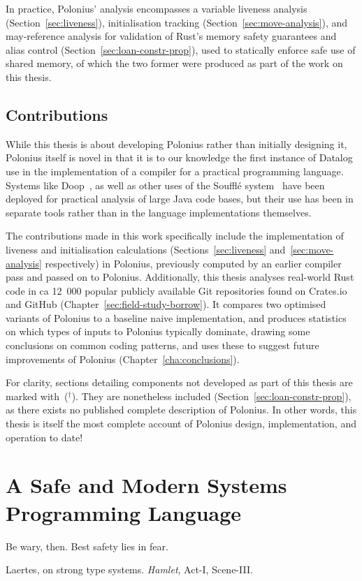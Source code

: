 \documentclass[11pt,a4paper,twoside,openany]{report}
\newcommand{\notmine}[0] {$^\dagger$}
\renewcommand\_{\textunderscore\allowbreak}
\begin{document}
In practice, Polonius' analysis encompasses a variable liveness analysis
(Section~\ref{sec:liveness}), initialisation tracking
(Section~\ref{sec:move-analysis}), and may-reference analysis for validation of
Rust's memory safety guarantees and alias control
(Section~\ref{sec:loan-constr-prop}), used to statically enforce safe use of
shared memory, of which the two former were produced as part of the work on this
thesis.

\section{Contributions}\label{sec:contributions}

While this thesis is about developing Polonius rather than initially designing
it, Polonius itself is novel in that it is to our knowledge the first instance
of Datalog use in the implementation of a compiler for a practical programming
language. Systems like Doop~\cite{bravenboer_strictly_2009}, as well as other
uses of the Souffl{\'e} system~\cite{souffle} have been deployed for practical
analysis of large Java code bases, but their use has been in separate tools
rather than in the language implementations themselves.

The contributions made in this work specifically include the implementation of
liveness and initialisation calculations (Sections~\ref{sec:liveness}
and~\ref{sec:move-analysis} respectively) in Polonius, previously computed by an
earlier compiler pass and passed on to Polonius. Additionally, this thesis
analyses real-world Rust code in ca 12~000 popular publicly available Git
repositories found on Crates.io and GitHub
(Chapter~\ref{sec:field-study-borrow}). It compares two optimised variants of
Polonius to a baseline naive implementation, and produces statistics on which
types of inputs to Polonius typically dominate, drawing some conclusions on
common coding patterns, and uses these to suggest future improvements of
Polonius (Chapter~\ref{cha:conclusions}).

For clarity, sections detailing components not developed as part of this thesis
are marked with~(\notmine{}). They are nonetheless included
(Section~\ref{sec:loan-constr-prop}), as there exists no published complete
description of Polonius. In other words, this thesis is itself the most complete
account of Polonius design, implementation, and operation to date!

\chapter{A Safe and Modern Systems Programming Language}\label{cha:background}
\epigraph{Be wary, then. Best safety lies in fear.}%
{Laertes, on strong type systems. \textit{Hamlet}, Act-I, Scene-III.}
\end{document}
